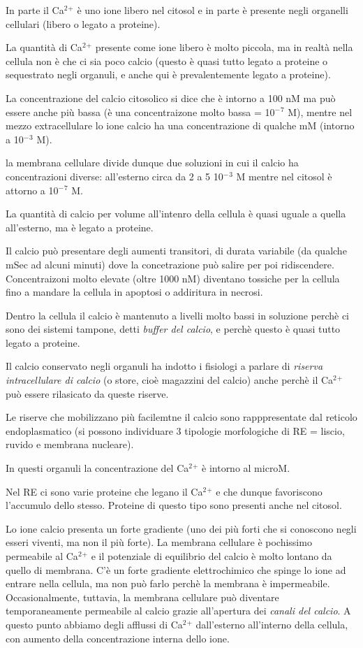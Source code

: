 \documentclass[]{article}
\begin{document}
In parte il Ca\(^2\)\(^+\) è uno ione libero nel citosol e in parte è
presente negli organelli cellulari (libero o legato a proteine).

La quantità di Ca\(^2\)\(^+\) presente come ione libero è molto piccola,
ma in realtà nella cellula non è che ci sia poco calcio (questo è quasi
tutto legato a proteine o sequestrato negli organuli, e anche qui è
prevalentemente legato a proteine).

La concentrazione del calcio citosolico si dice che è intorno a 100 nM
ma può essere anche più bassa (è una concentraizone molto bassa =
10\(^-\)\(^7\) M), mentre nel mezzo extracellulare lo ione calcio ha una
concentrazione di qualche mM (intorno a 10\(^-\)\(^3\) M).

la membrana cellulare divide dunque due soluzioni in cui il calcio ha
concentrazioni diverse: all'esterno circa da 2 a 5 10\(^-\)\(^3\) M
mentre nel citosol è attorno a 10\(^-\)\(^7\) M.

La quantità di calcio per volume all'intenro della cellula è quasi
uguale a quella all'esterno, ma è legato a proteine.

Il calcio può presentare degli aumenti transitori, di durata variabile
(da qualche mSec ad alcuni minuti) dove la concetrazione può salire per
poi ridiscendere. Concentraizoni molto elevate (oltre 1000 nM) diventano
tossiche per la cellula fino a mandare la cellula in apoptosi o
addiritura in necrosi.

Dentro la cellula il calcio è mantenuto a livelli molto bassi in
soluzione perchè ci sono dei sistemi tampone, detti \emph{buffer del
calcio}, e perchè questo è quasi tutto legato a proteine.

Il calcio conservato negli organuli ha indotto i fisiologi a parlare di
\emph{riserva intracellulare di calcio} (o store, cioè magazzini del
calcio) anche perchè il Ca\(^2\)\(^+\) può essere rilasicato da queste
riserve.

Le riserve che mobilizzano più facilemtne il calcio sono rapppresentate
dal reticolo endoplasmatico (si possono individuare 3 tipologie
morfologiche di RE = liscio, ruvido e membrana nucleare).

In questi organuli la concentrazione del Ca\(^2\)\(^+\) è intorno al
microM.

Nel RE ci sono varie proteine che legano il Ca\(^2\)\(^+\) e che dunque
favoriscono l'accumulo dello stesso. Proteine di questo tipo sono
presenti anche nel citosol.

Lo ione calcio presenta un forte gradiente (uno dei più forti che si
conoscono negli esseri viventi, ma non il più forte). La membrana
cellulare è pochissimo permeabile al Ca\(^2\)\(^+\) e il potenziale di
equilibrio del calcio è molto lontano da quello di membrana. C'è un
forte gradiente elettrochimico che spinge lo ione ad entrare nella
cellula, ma non può farlo perchè la membrana è impermeabile.
Occasionalmente, tuttavia, la membrana cellulare può diventare
temporaneamente permeabile al calcio grazie all'apertura dei
\emph{canali del calcio}. A questo punto abbiamo degli afflussi di
Ca\(^2\)\(^+\) dall'esterno all'interno della cellula, con aumento della
concentrazione interna dello ione.
\end{document}

